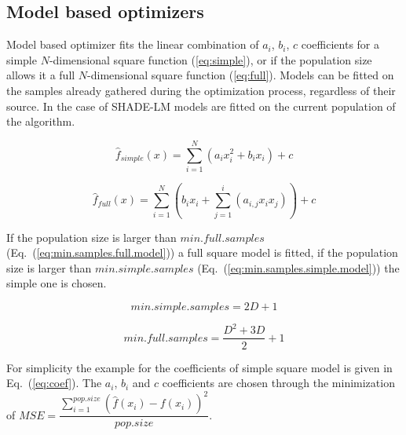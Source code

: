 \documentclass[manuscript]{acmart}
\begin{document}
\subsection{Model based optimizers}

Model based optimizer fits the linear combination
of $a_i$, $b_i$, $c$ coefficients for a simple
$N$-dimensional square function (\ref{eq:simple}), or if the population
size allows it a full $N$-dimensional square function (\ref{eq:full}).
Models can be fitted on the samples already gathered during the optimization process,
regardless of their source.
In the case of SHADE-LM models are fitted on the current population of the algorithm.

\begin{equation}
	\hat{f}_{simple}(x) = \sum\limits_{i=1}^{N}(a_ix_i^2 + b_ix_i) + c
	\label{eq:simple}
\end{equation}

\begin{equation}
	\hat{f}_{full}(x) = \sum\limits_{i=1}^{N} \left( b_ix_i + \sum\limits_{j=1}^{i}(a_{i,j}x_ix_j )\right) + c
	\label{eq:full}
\end{equation}

If the population size is larger than $min.full.samples$ (Eq.~(\ref{eq:min.samples.full.model}))
a full square model is fitted, if the population size is larger than $min.simple.samples$
(Eq.~(\ref{eq:min.samples.simple.model})) the simple one is chosen.

\begin{equation}
	min.simple.samples = 2D + 1
	\label{eq:min.samples.simple.model}
\end{equation}

\begin{equation}
	min.full.samples = \dfrac{D^2+ 3D}{2} + 1
	\label{eq:min.samples.full.model}
\end{equation}

For simplicity the example for the coefficients of simple square model is given in Eq.~(\ref{eq:coef}). The $a_i$, $b_i$ and $c$ coefficients are chosen through the minimization of $MSE = \dfrac{\sum\limits_{i=1}^{pop.size}(\hat{f}(x_i)-f(x_i))^2}{pop.size}$.
\end{document}
